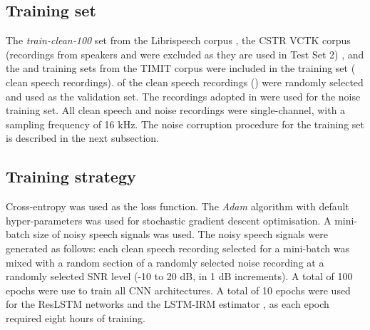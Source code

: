 \documentclass[letterpaper]{article} \usepackage{aaai20}  \usepackage{times}  \usepackage{helvet} \usepackage{courier}  \usepackage[hyphens]{url}  \usepackage{graphicx} \urlstyle{rm} \def\UrlFont{\rm}  \usepackage{graphicx}  \frenchspacing  \setlength{\pdfpagewidth}{8.5in}  \setlength{\pdfpageheight}{11in}
\begin{document}
\subsection{Training set}
The \textit{train-clean-100} set from the Librispeech corpus \cite{panayotov2015librispeech}, the CSTR VCTK corpus (recordings from speakers  and  were excluded as they are used in Test Set 2) \cite{veaux2017cstr}, and the  and  training sets from the TIMIT corpus \cite{garofolo1993darpa} were included in the training set ( clean speech recordings).  of the clean speech recordings () were randomly selected and used as the validation set. The  recordings adopted in \cite{nicolson2019deep} were used for the noise training set. All clean speech and noise recordings were single-channel, with a sampling frequency of 16 kHz. The noise corruption procedure for the training set is described in the next subsection.

\subsection{Training strategy}\label{sece}
Cross-entropy was used as the loss function. The \textit{Adam} algorithm \cite{kingma2014adam} with default hyper-parameters was used for stochastic gradient descent optimisation. A mini-batch size of  noisy speech signals was used. The noisy speech signals were generated as follows: each clean speech recording selected for a mini-batch was mixed with a random section of a randomly selected noise recording at a randomly selected SNR level (-10 to 20 dB, in 1 dB increments). A total of 100 epochs were use to train all CNN architectures. A total of 10 epochs were used for the ResLSTM networks and the LSTM-IRM estimator \cite{chen2017long}, as each epoch required eight hours of training.
\end{document}
